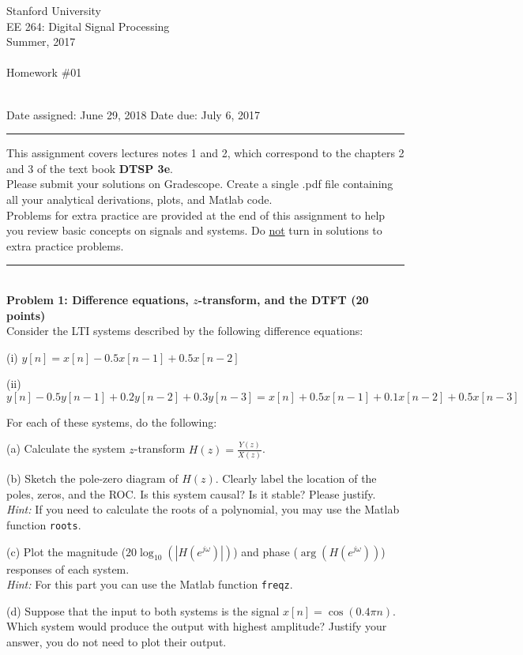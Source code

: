 \documentclass[12pt]{report}
\begin{document}
\thispagestyle{empty}
\begin{centering}
{\large Stanford University}\\
{\large EE 264: Digital Signal Processing}\\
{\large Summer, 2017} \\
\mbox{}\\
{\large Homework \#01}\\
\mbox{}\\
\end{centering}
\noindent Date assigned:  June 29, 2018 \hfill
Date due: July 6, 2017\\
\noindent \rule{6.5 in}{0.5pt}
  This assignment covers lectures notes 1 and 2, which correspond to the chapters 2 and 3 of the text book {\bf DTSP 3e}. \\
  Please submit your solutions on Gradescope. Create a single .pdf file containing all your analytical derivations, plots, and Matlab code. \\
  Problems for extra practice are provided at the end of this assignment to help you review basic concepts on signals and systems. Do \underline{not} turn in solutions to extra practice problems.

\noindent
\rule{6.5 in}{0.5pt}
\mbox{}\\
\noindent
{\bf Problem 1: Difference equations, $z$-transform, and the DTFT (20 points)} \\
Consider the LTI systems described by the following difference equations:

\begin{description}
	\item{(i)} $y[n] = x[n] - 0.5x[n-1] + 0.5x[n-2]$
	\item{(ii)} $y[n] - 0.5y[n-1] + 0.2y[n-2] + 0.3y[n-3] = x[n] + 0.5x[n-1] + 0.1x[n-2] + 0.5x[n-3]$
\end{description}
\noindent
For each of these systems, do the following:
\begin{description}
	\item{(a)} Calculate the system $z$-transform $H(z) = \frac{Y(z)}{X(z)}$.
	\item{(b)} Sketch the pole-zero diagram of $H(z)$. Clearly label the location of the poles, zeros, and the ROC. Is this system causal? Is it stable? Please justify.\\
	\textit{Hint:} If you need to calculate the roots of a polynomial, you may use the Matlab function \texttt{roots}.
	\item{(c)} Plot the magnitude ($20\log_{10}(|H(e^{j\omega})|)$) and phase ($\arg(H(e^{j\omega}))$) responses of each system. \\
	\textit{Hint:} For this part you can use the Matlab function \texttt{freqz}.
	\item {(d)} Suppose that the input to both systems is the signal $x[n] = \cos(0.4\pi n)$. Which system would produce the output with highest amplitude? Justify your answer, you do not need to plot their output.
\end{description}
\end{document}
